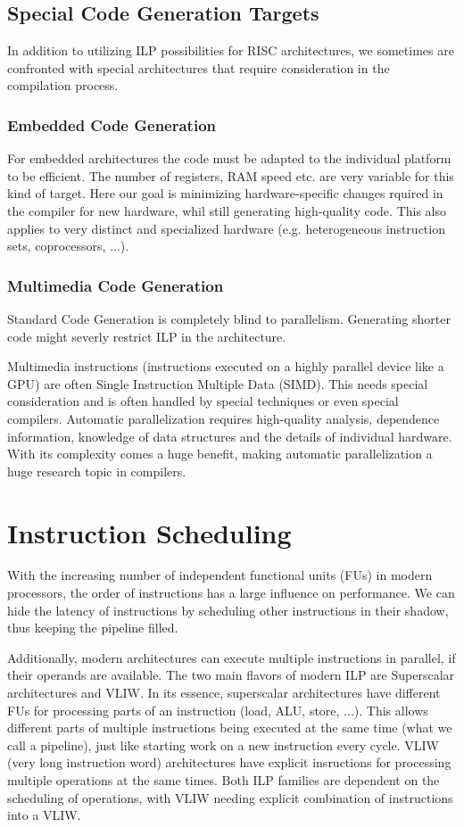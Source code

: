 \documentclass{article}
\begin{document}
\subsection{Special Code Generation Targets}
In addition to utilizing ILP possibilities for RISC architectures, we sometimes are confronted with special architectures that require consideration in the compilation process.

\subsubsection{Embedded Code Generation}
For embedded architectures the code must be adapted to the individual platform to be efficient.
The number of registers, RAM speed etc. are very variable for this kind of target.
Here our goal is minimizing hardware-specific changes rquired in the compiler for new hardware, whil still generating high-quality code.
This also applies to very distinct and specialized hardware (e.g. heterogeneous instruction sets, coprocessors, ...).

\subsubsection{Multimedia Code Generation}
Standard Code Generation is completely blind to parallelism.
Generating shorter code might severly restrict ILP in the architecture.

Multimedia instructions (instructions executed on a highly parallel device like a GPU) are often Single Instruction Multiple Data (SIMD).
This needs special consideration and is often handled by special techniques or even special compilers.
Automatic parallelization requires high-quality analysis, dependence information, knowledge of data structures and the details of individual hardware.
With its complexity comes a huge benefit, making automatic parallelization a huge research topic in compilers.

\section{Instruction Scheduling}
With the increasing number of independent functional units (FUs) in modern processors, the order of instructions has a large influence on performance.
We can hide the latency of instructions by scheduling other instructions in their shadow, thus keeping the pipeline filled.

Additionally, modern architectures can execute multiple instructions in parallel, if their operands are available.
The two main flavors of modern ILP are Superscalar architectures and VLIW.
In its essence, superscalar architectures have different FUs for processing parts of an instruction (load, ALU, store, ...).
This allows different parts of multiple instructions being executed at the same time (what we call a pipeline), just like starting work on a new instruction every cycle.
VLIW (very long instruction word) architectures have explicit insructions for processing multiple operations at the same times.
Both ILP families are dependent on the scheduling of operations, with VLIW needing explicit combination of instructions into a VLIW.
\end{document}
